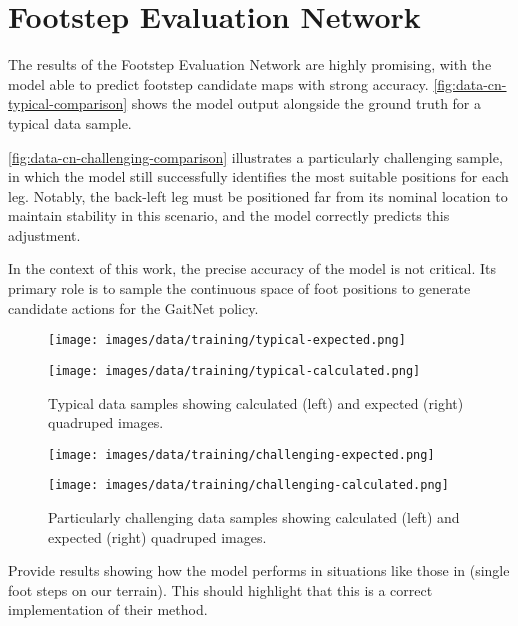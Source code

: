\section{Footstep Evaluation Network}
\label{sec:footstep-evaluation-network}

The results of the Footstep Evaluation Network are highly promising,
with the model able to predict footstep candidate maps with strong
accuracy. \autoref{fig:data-cn-typical-comparison} shows the model
output alongside the ground truth for a typical data sample.

\autoref{fig:data-cn-challenging-comparison} illustrates a
particularly challenging sample, in which the model still
successfully identifies the most suitable positions for each leg.
Notably, the back-left leg must be positioned far from its nominal
location to maintain stability in this scenario, and the model
correctly predicts this adjustment.

In the context of this work, the precise accuracy of the model is not
critical. Its primary role is to sample the continuous space of foot
positions to generate candidate actions for the GaitNet policy.

\begin{figure}[H]
  \centering
  \begin{minipage}[T]{0.45\textwidth}
    \centering
    \texttt{[image: images/data/training/typical-expected.png]}
  \end{minipage}
  \hfill
  \begin{minipage}[T]{0.45\textwidth}
    \centering
    \texttt{[image: images/data/training/typical-calculated.png]}
  \end{minipage}
  \hfill

  \caption{Typical data samples showing calculated (left) and
  expected (right) quadruped images.}
  \label{fig:data-cn-typical-comparison}
\end{figure}

\begin{figure}[H]
  \centering
  \begin{minipage}[T]{0.45\textwidth}
    \centering
    \texttt{[image: images/data/training/challenging-expected.png]}
  \end{minipage}
  \hfill
  \begin{minipage}[T]{0.45\textwidth}
    \centering
    \texttt{[image: images/data/training/challenging-calculated.png]}
  \end{minipage}
  \hfill

  \caption{Particularly challenging data samples showing calculated (left) and
  expected (right) quadruped images.}
  \label{fig:data-cn-challenging-comparison}
\end{figure}

\begin{todo}
  Provide results showing how the model performs in situations like
  those   in \cite{bratta_contactnet_2024} (single foot steps on our
  terrain).   This should highlight that this is a correct
  implementation of their method.
\end{todo}
